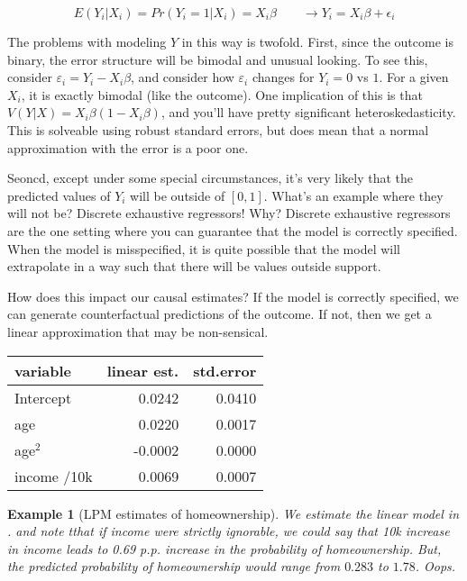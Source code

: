 \documentclass{tufte-handout}
\theoremstyle{break}
\newtheorem{exmp}{Example}
\begin{document}
\begin{equation}
    E(Y_{i}|X_{i}) = Pr(Y_{i} = 1 | X_{i}) = X_{i}\beta \qquad \rightarrow Y_{i} = X_{i}\beta + \epsilon_{i}
\end{equation}

The problems with modeling $Y$ in this way is twofold. First, since the outcome is  binary, the error structure will be bimodal and unusual looking. To see this, consider $\varepsilon_{i} = Y_{i} - X_{i}\beta$, and consider how $\varepsilon_{i}$ changes for $Y_{i} = 0$ vs $1$. For a given $X_{i}$, it is exactly bimodal (like the outcome). One implication of this is that $V(Y|X) = X_{i}\beta (1- X_{i}\beta)$, and you'll have pretty significant heteroskedasticity. This is solveable using robust standard errors, but does mean that a normal approximation with the error is a poor one.

Seoncd, except under some special circumstances, it's very likely that the predicted values of $Y_{i}$ will be outside of $[0,1]$.  What's an example where they will not be? Discrete exhaustive regressors!  Why? Discrete exhaustive regressors are the one setting where you can guarantee that the model is correctly specified. When the model is misspecified, it is quite possible that the model will extrapolate in a way such that there will be values outside support.

How does this impact our causal estimates? If the model is correctly specified, we can generate  counterfactual predictions of the outcome. If not, then we get a linear approximation that may be non-sensical.
  \begin{margintable}
    \caption{LPM model estimates}
    \label{tab:lpm}
    \begin{tabular}{lrr}
        variable &  linear est.  &  std.error\\
        \midrule
        Intercept & 0.0242 &   0.0410\\
        age&   0.0220 &   0.0017\\
        age$^2$&  -0.0002 &   0.0000\\
        income /10k&   0.0069    & 0.0007\\
        \end{tabular}
  \end{margintable}
\begin{boxD}
\begin{exmp}[LPM estimates of homeownership]
    \label{example:homeownership}
We estimate the linear model in . and note tthat if income were strictly ignorable, we could say that 10k increase in income leads to 0.69 p.p. increase in the probability of homeownership. But, the predicted probability of homeownership would range from $0.283$ to  $1.78$. Oops.
\end{exmp}
\end{boxD}
\end{document}
